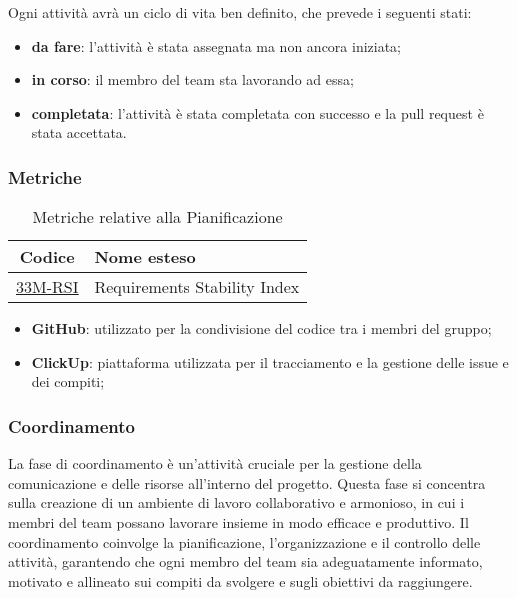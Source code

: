 Ogni attività avrà un ciclo di vita ben definito, che prevede i seguenti stati:
\begin{itemize}
    \item \textbf{da fare}: l'attività è stata assegnata ma non ancora iniziata;
    \item \textbf{in corso}: il membro del team sta lavorando ad essa;
    \item \textbf{completata}: l'attività è stata completata con successo e la pull request è stata accettata.
\end{itemize}

\newpage
\subsubsection{Metriche}
\begin{table}[!h]
	\centering
	\begin{tabular}{ | c | l | }
		\hline
		\textbf{Codice}                      & \textbf{Nome esteso}         \\
		\hline
        \underline{\hyperlink{33M}{33M-RSI}} & Requirements Stability Index \\
		\hline
	\end{tabular}
	\caption{Metriche relative alla Pianificazione}
\end{table}

\begin{itemize}
    \item \textbf{GitHub}: utilizzato per la condivisione del codice tra i membri del gruppo;
    \item \textbf{ClickUp}: piattaforma utilizzata per il tracciamento e la gestione delle issue e dei compiti;
\end{itemize}

\subsubsection{Coordinamento}
La fase di coordinamento è un'attività cruciale per la gestione della comunicazione e delle risorse all'interno del progetto. Questa fase si concentra sulla creazione di un ambiente di lavoro collaborativo e armonioso, in cui i membri del team possano lavorare insieme in modo efficace e produttivo. Il coordinamento coinvolge la pianificazione, l'organizzazione e il controllo delle attività, garantendo che ogni membro del team sia adeguatamente informato, motivato e allineato sui compiti da svolgere e sugli obiettivi da raggiungere. 


